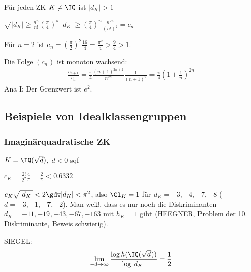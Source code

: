 \renewcommand{\lecdate}{25.11.2014}

\begin{Folgerung}
 Für jeden ZK $K\neq \IQ$ ist $|d_K|>1$
\end{Folgerung}
\begin{Beweis}
 $\sqrt{|d_K|}\geq \frac{n^n}{n!}\left(\frac{\pi}{4}\right)^s$ \folge $|d_K|\geq \left(\frac{\pi}{4}\right)^{n} \frac{n^{2n}}{(n!)^2}=c_n$
 
 Für $n=2$ ist $c_n=\left(\frac{\pi}{2}\right)^2\frac{16}{4} = \frac{\pi^2}{4}>\frac{9}{4}>1$.
 
 Die Folge $(c_n)$ ist monoton wachsend:
 \begin{align*}
  \frac{c_{n+1}}{c_n}=\frac{\pi}{4} \frac{(n+1)^{2n+2}}{n^{2n}} \frac{1}{(n+1)^2}=\frac{\pi}{4} \left( 1+\frac{1}{n}\right)^{2n}
 \end{align*}
Ana I: Der Grenzwert ist $e^2$.
\end{Beweis}

\subsection{Beispiele von Idealklassengruppen}

\subsubsection{Imaginärquadratische ZK}
 
 $K=\IQ(\sqrt d)$, $d<0$ sqf
 
 $c_K=\frac{2!}{2^2}\frac{4}{\pi}=\frac{2}{\pi}<0.6332$
 
 $c_K\sqrt{|d_K|}<2 \gdw |d_K|< \pi^2$, also $\Cl_K=1$ für $d_K=-3,-4,-7,-8$ ($d=-3,-1,-7,-2$). 
 Man weiß, dass es nur noch die Diskriminanten $d_K=-11,-19,-43,-67,-163$ mit $h_K=1$ gibt (HEEGNER, Problem der 10. Diskriminante, Beweis schwierig).
 
 SIEGEL:\[ \lim_{-d\rightarrow\infty} \frac{\log h(\IQ(\sqrt d))}{\log|d_K|}=\frac{1}{2}\]
 
